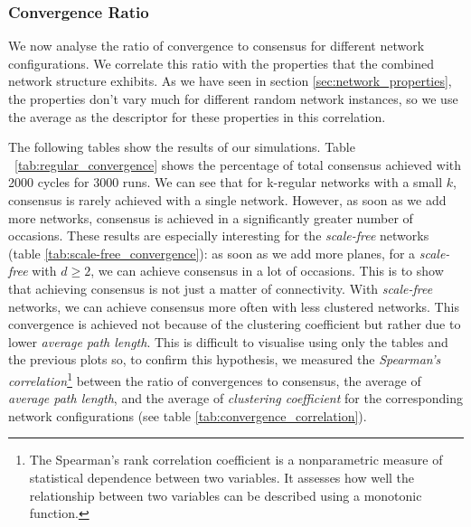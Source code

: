 \documentclass[preprint,number]{elsarticle}
\begin{document}
\subsubsection{Convergence Ratio}
\label{sec:ctx_perm_convergence}
\noindent We now analyse the ratio of convergence to consensus for different network configurations. We correlate this ratio with the properties that the combined network structure exhibits. As we have seen in section \ref{sec:network_properties}, the properties don't vary much for different random network instances, so we use the average as the descriptor for these properties in this correlation.

The following tables show the results of our simulations. Table ~\ref{tab:regular_convergence} shows the percentage of total consensus achieved with 2000 cycles for 3000 runs. We can see that for k-regular networks with a small $k$, consensus is rarely achieved with a single network. However, as soon as we add more networks, consensus is achieved in a significantly greater number of occasions. These results are especially interesting for the \textit{scale-free }networks (table \ref{tab:scale-free_convergence}): as soon as we add more planes, for a \textit{scale-free} with $d\ge2$, we can achieve consensus in a lot of occasions. This is to show that achieving consensus is not just a matter of connectivity. With \textit{scale-free} networks, we can achieve consensus more often with less clustered networks. This convergence is achieved not because of the clustering coefficient but rather due to lower \textit{average path length}. This is difficult to visualise using only the tables and the previous plots so, to confirm this hypothesis, we measured the \textit{Spearman's correlation}\footnote{The Spearman's rank correlation coefficient is a nonparametric measure of statistical dependence between two variables. It assesses how well the relationship between two variables can be described using a monotonic function.} between the ratio of convergences to consensus, the average of \textit{average path length}, and the average of \textit{clustering coefficient} for the corresponding network configurations (see table \ref{tab:convergence_correlation}).
\end{document}
